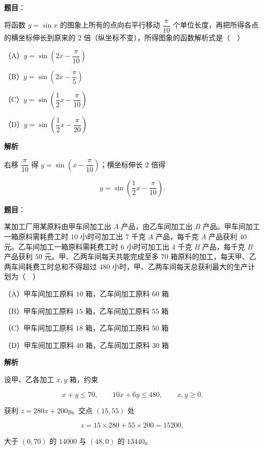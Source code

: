 \begin{answer}

\textbf{题目}：

将函数 $y=\sin x$ 的图象上所有的点向右平行移动 $\dfrac\pi{10}$ 个单位长度，再把所得各点的横坐标伸长到原来的 $2$ 倍（纵坐标不变），所得图象的函数解析式是（　）

（A）$y=\sin\left(2x-\dfrac\pi{10}\right)$

（B）$y=\sin\left(2x-\dfrac\pi5\right)$

（C）$y=\sin\left(\dfrac12x-\dfrac\pi{10}\right)$

（D）$y=\sin\left(\dfrac12x-\dfrac\pi{20}\right)$

\textbf{解析}

右移 $\dfrac\pi{10}$ 得 $y=\sin\left(x-\dfrac\pi{10}\right)$；横坐标伸长 $2$ 倍得

\nopagebreak[4]
\[y=\sin\left(\frac12x-\frac\pi{10}\right).\]


\end{answer}
\begin{answer}

\textbf{题目}：

某加工厂用某原料由甲车间加工出 $A$ 产品，由乙车间加工出 $B$ 产品。甲车间加工一箱原料需耗费工时 $10$ 小时可加工出 $7$ 千克 $A$ 产品，每千克 $A$ 产品获利 $40$ 元。乙车间加工一箱原料需耗费工时 $6$ 小时可加工出 $4$ 千克 $B$ 产品，每千克 $B$ 产品获利 $50$ 元。甲、乙两车间每天共能完成至多 $70$ 箱原料的加工，每天甲、乙两车间耗费工时总和不得超过 $480$ 小时，甲、乙两车间每天总获利最大的生产计划为（　）

（A）甲车间加工原料 $10$ 箱，乙车间加工原料 $60$ 箱

（B）甲车间加工原料 $15$ 箱，乙车间加工原料 $55$ 箱

（C）甲车间加工原料 $18$ 箱，乙车间加工原料 $50$ 箱

（D）甲车间加工原料 $40$ 箱，乙车间加工原料 $30$ 箱

\textbf{解析}

设甲、乙各加工 $x,y$ 箱，约束

\nopagebreak[4]
\[x+y\leqslant70,\qquad 10x+6y\leqslant480,\qquad x,y\geqslant0.\]

获利 $z=280x+200y$。交点 $(15,55)$ 处

\nopagebreak[4]
\[z=15\times280+55\times200=15200,\]

大于 $(0,70)$ 的 $14000$ 与 $(48,0)$ 的 $13440$。


\end{answer}
